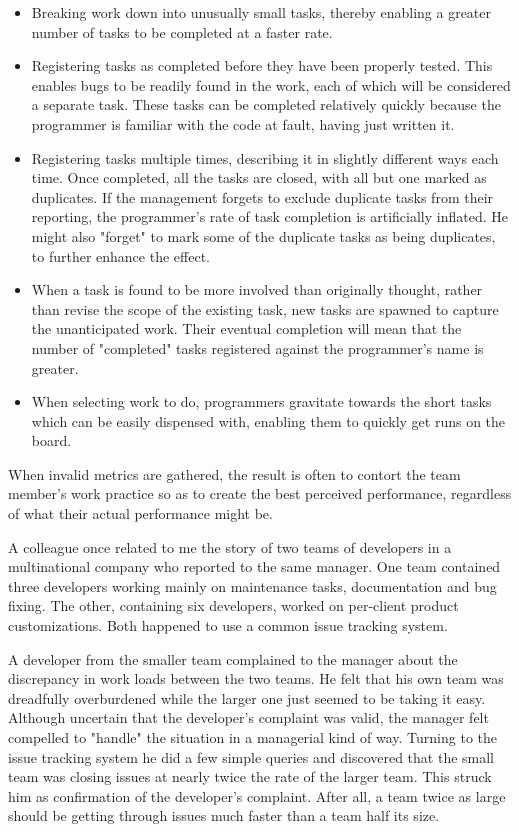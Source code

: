 \documentclass{article}
\begin{document}
\begin{enumerate}
\begin{enumerate}
\begin{itemize}
\item Breaking work down into unusually small tasks, thereby enabling a
greater number of tasks to be completed at a faster rate.\\
\item Registering tasks as completed before they have been properly tested.
This enables bugs to be readily found in the work, each of which will
be considered a separate task. These tasks can be completed
relatively quickly because the programmer is familiar with the code
at fault, having just written it.\\
\item Registering tasks multiple times, describing it in slightly different
ways each time. Once completed, all the tasks are closed, with all
but one marked as duplicates. If the management forgets to exclude
duplicate tasks from their reporting, the programmer's rate of task
completion is artificially inflated. He might also "forget" to mark
some of the duplicate tasks as being duplicates, to further enhance
the effect.
\item When a task is found to be more involved than originally thought,
rather than revise the scope of the existing task, new tasks are
spawned to capture the unanticipated work. Their eventual completion
will mean that the number of "completed" tasks registered against the
programmer's name is greater.\\
\item When selecting work to do, programmers gravitate towards the short
tasks which can be easily dispensed with, enabling them to quickly
get runs on the board.
\end{itemize}

When invalid metrics are gathered, the result is often to contort the
team member's work practice so as to create the best perceived
performance, regardless of what their actual performance might be.

A colleague once related to me the story of two teams of developers in a
multinational company who reported to the same manager. One team
contained three developers working mainly on maintenance tasks,
documentation and bug fixing. The other, containing six developers,
worked on per-client product customizations. Both happened to use a
common issue tracking system.

A developer from the smaller team complained to the manager about the
discrepancy in work loads between the two teams. He felt that his own
team was dreadfully overburdened while the larger one just seemed to be
taking it easy. Although uncertain that the developer's complaint was
valid, the manager felt compelled to "handle" the situation in a
managerial kind of way. Turning to the issue tracking system he did a
few simple queries and discovered that the small team was closing issues
at nearly twice the rate of the larger team. This struck him as
confirmation of the developer's complaint. After all, a team twice as
large should be getting through issues much faster than a team half its
size.


\end{enumerate}
\end{enumerate}
\end{document}
